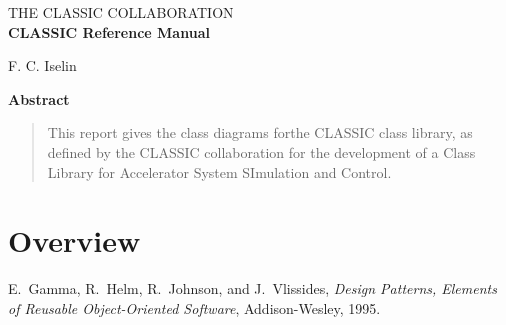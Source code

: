 \documentclass[11pt,a4paper]{report}
\begin{document}
\begin{center}
THE CLASSIC COLLABORATION \\
\vspace{3cm}
{\huge {\bf CLASSIC Reference Manual}}

\vspace{1cm}
F. C. Iselin

\vspace{2cm}
{\bf Abstract}
\end{center}

\begin{quote}
  This report gives the class diagrams forthe CLASSIC class library,
  as defined by the CLASSIC collaboration for the development of a
  Class Library for Accelerator System SImulation and Control.
\end{quote}

\clearpage

\setlength{\unitlength}{0.8pt}

\tableofcontents
\listoffigures


\chapter{Overview}



\clearpage
\begin{thebibliography}{99}

  E.~Gamma, R.~Helm, R.~Johnson, and J.~Vlissides,
  \textit{Design Patterns, Elements of Reusable Object-Oriented
    Software},
  Addison-Wesley, 1995.

\end{thebibliography}


\clearpage
\printindex
\end{document}
